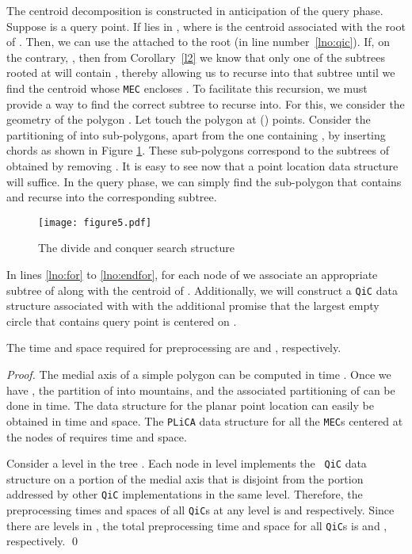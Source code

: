 \documentclass[12pt]{llncs}
\begin{document}
The centroid decomposition is constructed in anticipation of the query phase. Suppose  is a query point. If  lies in  , where  is  the centroid  associated with the root of . Then, we can use the  attached  to the root (in line number\ \ref{lno:qic}). If, on the contrary, , then 
from Corollary\ \ref{l2} we know that only one of the 
subtrees rooted at  will contain , thereby allowing us to recurse into that 
subtree until we find the centroid whose {\tt MEC} encloses . To facilitate this recursion, we must provide a way to find the correct subtree 
to recurse into. For this, we consider the geometry of the polygon . Let  touch the polygon  at  
() 
points. Consider the partitioning of   into  sub-polygons, apart 
from the 
one containing , by inserting chords as shown in Figure \ref{recursion}. These 
 sub-polygons correspond to the  subtrees of  obtained by removing . It is easy to 
see now that a point location data structure will suffice. In the query phase, 
we can simply find the sub-polygon that contains  and recurse into the 
corresponding subtree.



\begin{figure}
\centering
\texttt{[image: figure5.pdf]}
\caption{The divide and conquer search structure}
\label{recursion}
\end{figure}



In lines \ref{lno:for} to \ref{lno:endfor}, for each node  of  we
associate an appropriate subtree  of  along with the centroid  of . Additionally, we will construct a {\tt QiC} data structure associated with  with the 
additional promise that the largest empty circle  that contains query point  is 
centered on . 



\begin{lemma} \label{sv}
The time and space required for preprocessing  
are  and , 
respectively.
\end{lemma}
\begin{proof}
The medial axis  of a simple polygon can  be computed in  time 
\cite{CSW99}. Once we have , the partition of  into mountains, and the 
associated 
partitioning of
  can be done in  time. 
The data structure for the planar point location can easily be obtained in  
time 
and  space. The {\tt PLiCA} 
data structure for all the {\tt MEC}s centered at the nodes of  requires  
time and  space. 

Consider a level  in the tree . Each node in level  implements the {\tt 
QiC} data structure on a  portion of the medial axis that is disjoint from the portion 
addressed by other {\tt QiC} implementations in the same level. Therefore,  the 
preprocessing times and spaces of all {\tt QiC}s at any level  is  
and  respectively. Since there are  levels in , the total 
preprocessing time and space for all {\tt QiC}s is  and , 
respectively.
\qed
\end{proof}
\end{document}
